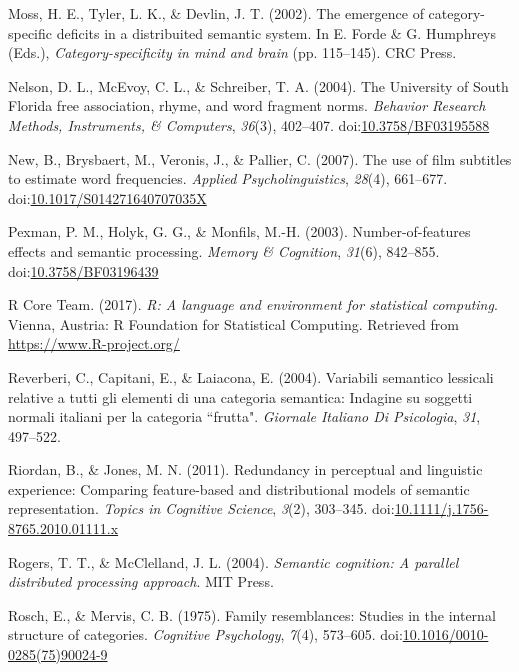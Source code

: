 \documentclass[english,,man]{apa6}
\theoremstyle{definition}
\theoremstyle{definition}
\theoremstyle{definition}
\theoremstyle{remark}
\begin{document}
\leavevmode\hypertarget{ref-Moss2002}{}%
Moss, H. E., Tyler, L. K., \& Devlin, J. T. (2002). The emergence of
category-specific deficits in a distribuited semantic system. In E.
Forde \& G. Humphreys (Eds.), \emph{Category-specificity in mind and
brain} (pp. 115--145). CRC Press.

\leavevmode\hypertarget{ref-Nelson2004}{}%
Nelson, D. L., McEvoy, C. L., \& Schreiber, T. A. (2004). The University
of South Florida free association, rhyme, and word fragment norms.
\emph{Behavior Research Methods, Instruments, \& Computers},
\emph{36}(3), 402--407.
doi:\href{https://doi.org/10.3758/BF03195588}{10.3758/BF03195588}

\leavevmode\hypertarget{ref-New2007}{}%
New, B., Brysbaert, M., Veronis, J., \& Pallier, C. (2007). The use of
film subtitles to estimate word frequencies. \emph{Applied
Psycholinguistics}, \emph{28}(4), 661--677.
doi:\href{https://doi.org/10.1017/S014271640707035X}{10.1017/S014271640707035X}

\leavevmode\hypertarget{ref-Pexman2003}{}%
Pexman, P. M., Holyk, G. G., \& Monfils, M.-H. (2003).
Number-of-features effects and semantic processing. \emph{Memory \&
Cognition}, \emph{31}(6), 842--855.
doi:\href{https://doi.org/10.3758/BF03196439}{10.3758/BF03196439}

\leavevmode\hypertarget{ref-R-base}{}%
R Core Team. (2017). \emph{R: A language and environment for statistical
computing}. Vienna, Austria: R Foundation for Statistical Computing.
Retrieved from \url{https://www.R-project.org/}

\leavevmode\hypertarget{ref-Reverberi2004}{}%
Reverberi, C., Capitani, E., \& Laiacona, E. (2004). Variabili semantico
lessicali relative a tutti gli elementi di una categoria semantica:
Indagine su soggetti normali italiani per la categoria ``frutta".
\emph{Giornale Italiano Di Psicologia}, \emph{31}, 497--522.

\leavevmode\hypertarget{ref-Riordan2011}{}%
Riordan, B., \& Jones, M. N. (2011). Redundancy in perceptual and
linguistic experience: Comparing feature-based and distributional models
of semantic representation. \emph{Topics in Cognitive Science},
\emph{3}(2), 303--345.
doi:\href{https://doi.org/10.1111/j.1756-8765.2010.01111.x}{10.1111/j.1756-8765.2010.01111.x}

\leavevmode\hypertarget{ref-Rogers2004}{}%
Rogers, T. T., \& McClelland, J. L. (2004). \emph{Semantic cognition: A
parallel distributed processing approach}. MIT Press.

\leavevmode\hypertarget{ref-Rosch1975}{}%
Rosch, E., \& Mervis, C. B. (1975). Family resemblances: Studies in the
internal structure of categories. \emph{Cognitive Psychology},
\emph{7}(4), 573--605.
doi:\href{https://doi.org/10.1016/0010-0285(75)90024-9}{10.1016/0010-0285(75)90024-9}
\end{document}
